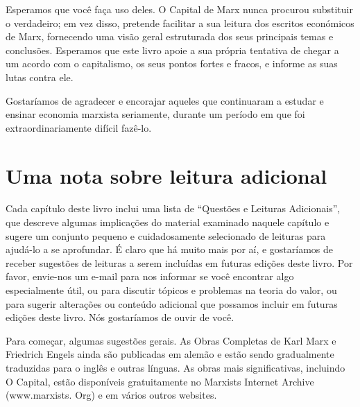  \par 
Esperamos que você faça uso deles. O Capital de Marx nunca procurou substituir o verdadeiro; em vez disso, pretende facilitar a sua leitura dos escritos económicos de Marx, fornecendo uma visão geral estruturada dos seus principais temas e conclusões. Esperamos que este livro apoie a sua própria tentativa de chegar a um acordo com o capitalismo, os seus pontos fortes e fracos, e informe as suas lutas contra ele.
 \par 
Gostaríamos de agradecer e encorajar aqueles que continuaram a estudar e ensinar economia marxista seriamente, durante um período em que foi extraordinariamente difícil fazê-lo.
 \par 
\section{Uma nota sobre leitura adicional}
 \par 
Cada capítulo deste livro inclui uma lista de “Questões e Leituras Adicionais”, que descreve algumas implicações do material examinado naquele capítulo e sugere um conjunto pequeno e cuidadosamente selecionado de leituras para ajudá-lo a se aprofundar. É claro que há muito mais por aí, e gostaríamos de receber sugestões de leituras a serem incluídas em futuras edições deste livro. Por favor, envie-nos um e-mail para nos informar se você encontrar algo especialmente útil, ou para discutir tópicos e problemas na teoria do valor, ou para sugerir alterações ou conteúdo adicional que possamos incluir em futuras edições deste livro. Nós gostaríamos de ouvir de você.
 \par 
Para começar, algumas sugestões gerais. As Obras Completas de Karl Marx e Friedrich Engels ainda são publicadas em alemão e estão sendo gradualmente traduzidas para o inglês e outras línguas. As obras mais significativas, incluindo O Capital, estão disponíveis gratuitamente no Marxists Internet Archive (www.marxists. Org) e em vários outros websites.
 \par 
